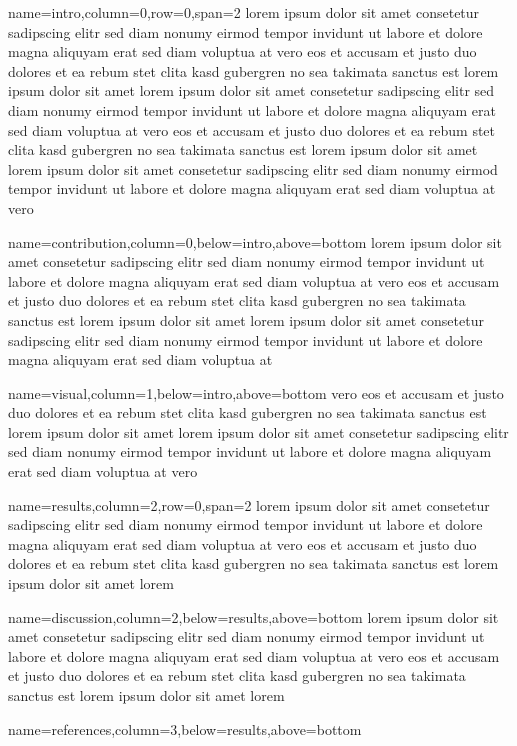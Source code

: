 \documentclass[landscape,archE,fontscale=0.3]{baposter}
\begin{document}
\begin{poster}
  {name=intro,column=0,row=0,span=2}{
    lorem ipsum dolor sit amet consetetur sadipscing elitr sed diam nonumy
    eirmod tempor invidunt ut labore et dolore magna aliquyam erat sed diam
    voluptua at vero eos et accusam et justo duo dolores et ea rebum stet clita
    kasd gubergren no sea takimata sanctus est lorem ipsum dolor sit amet lorem
    ipsum dolor sit amet consetetur sadipscing elitr sed diam nonumy eirmod
    tempor invidunt ut labore et dolore\cite{article}
    magna aliquyam erat sed diam voluptua at
    vero eos et accusam et justo duo dolores et ea rebum stet clita kasd
    gubergren no sea takimata sanctus est lorem ipsum dolor sit amet lorem ipsum
    dolor sit amet consetetur sadipscing elitr sed diam nonumy eirmod tempor
    invidunt ut labore et dolore magna aliquyam erat sed diam voluptua at vero
  }

  {name=contribution,column=0,below=intro,above=bottom}{
    lorem ipsum dolor sit amet consetetur sadipscing elitr sed diam nonumy
    eirmod tempor invidunt ut labore et dolore magna aliquyam erat sed diam
    voluptua at vero eos et accusam et justo duo dolores et ea rebum stet clita
    kasd gubergren no sea takimata sanctus est lorem ipsum dolor sit amet lorem
    ipsum dolor sit amet consetetur sadipscing elitr sed diam nonumy eirmod
    tempor invidunt ut labore et dolore\cite{article}
    magna aliquyam erat sed diam voluptua at
  }

  {name=visual,column=1,below=intro,above=bottom}{
    vero eos et accusam et justo duo dolores et ea rebum stet clita kasd
    gubergren no sea takimata sanctus est lorem ipsum dolor sit amet lorem ipsum
    dolor sit amet consetetur sadipscing elitr sed diam nonumy eirmod tempor
    invidunt ut labore et dolore magna aliquyam erat sed diam voluptua at vero
  }


  {name=results,column=2,row=0,span=2}{
    lorem ipsum dolor sit amet consetetur sadipscing elitr sed diam nonumy
    eirmod tempor invidunt ut labore et dolore magna aliquyam erat sed diam
    voluptua at vero eos et accusam et justo duo dolores et ea rebum stet clita
    kasd gubergren no sea takimata sanctus est lorem ipsum dolor sit amet lorem
  }

  {name=discussion,column=2,below=results,above=bottom}{
    lorem ipsum dolor sit amet consetetur sadipscing elitr sed diam nonumy
    eirmod tempor invidunt ut labore et dolore magna aliquyam erat sed diam
    voluptua at vero eos et accusam et justo duo dolores et ea rebum stet clita
    kasd gubergren no sea takimata sanctus est lorem ipsum dolor sit amet lorem
  }

  {name=references,column=3,below=results,above=bottom}{
    
    
  }

\end{poster}
\end{document}
